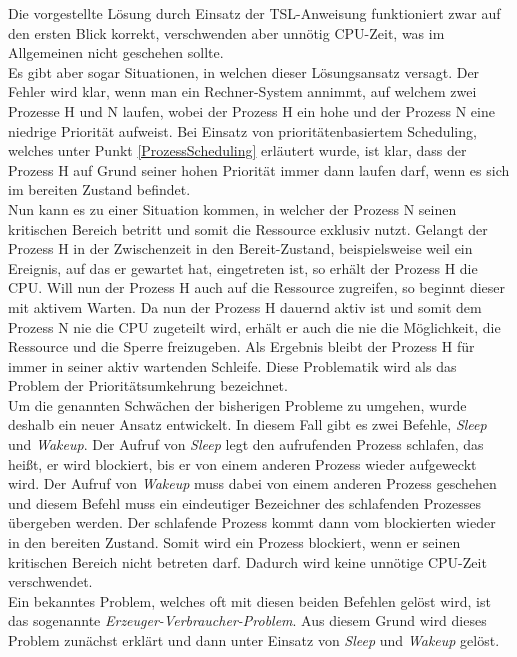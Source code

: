 \begin{description}
						Die vorgestellte Lösung durch Einsatz der TSL-Anweisung funktioniert zwar auf den ersten Blick korrekt, verschwenden aber unnötig CPU-Zeit, was im Allgemeinen nicht geschehen sollte.\\
						Es gibt aber sogar Situationen, in welchen dieser Lösungsansatz versagt. Der Fehler wird klar, wenn man ein Rechner-System annimmt, auf welchem zwei Prozesse H und N laufen, wobei der Prozess H ein hohe und der Prozess N eine niedrige Priorität aufweist. Bei Einsatz von prioritätenbasiertem Scheduling, welches unter Punkt \ref{ProzessScheduling} erläutert wurde, ist klar, dass der Prozess H auf Grund seiner hohen Priorität immer dann laufen darf, wenn es sich im bereiten Zustand befindet.\\
						Nun kann es zu einer Situation kommen, in welcher der Prozess N seinen kritischen Bereich betritt und somit die Ressource exklusiv nutzt. Gelangt der Prozess H in der Zwischenzeit in den Bereit-Zustand, beispielsweise weil ein Ereignis, auf das er gewartet hat, eingetreten ist, so erhält der Prozess H die CPU. Will nun der Prozess H auch auf die Ressource zugreifen, so beginnt dieser mit aktivem Warten. Da nun der Prozess H dauernd aktiv ist und somit dem Prozess N nie die CPU zugeteilt wird, erhält er auch die nie die Möglichkeit, die Ressource und die Sperre freizugeben. Als Ergebnis bleibt der Prozess H für immer in seiner aktiv wartenden Schleife. Diese Problematik wird als das Problem der Prioritätsumkehrung bezeichnet.\\
						Um die genannten Schwächen der bisherigen Probleme zu umgehen, wurde deshalb ein neuer Ansatz entwickelt. In diesem Fall gibt es zwei Befehle, \textit{Sleep} und \textit{Wakeup}. Der Aufruf von \textit{Sleep} legt den aufrufenden Prozess schlafen, das heißt, er wird blockiert, bis er von einem anderen Prozess wieder aufgeweckt wird. Der Aufruf von \textit{Wakeup} muss dabei von einem anderen Prozess geschehen und diesem Befehl muss ein eindeutiger Bezeichner des schlafenden Prozesses übergeben werden. Der schlafende Prozess kommt dann vom blockierten wieder in den bereiten Zustand. Somit wird ein Prozess blockiert, wenn er seinen kritischen Bereich nicht betreten darf. Dadurch wird keine unnötige CPU-Zeit verschwendet.\\
						Ein bekanntes Problem, welches oft mit diesen beiden Befehlen gelöst wird, ist das sogenannte \textit{Erzeuger-Verbraucher-Problem}. Aus diesem Grund wird dieses Problem zunächst erklärt und dann unter Einsatz von \textit{Sleep} und \textit{Wakeup} gelöst.
						

\end{description}

